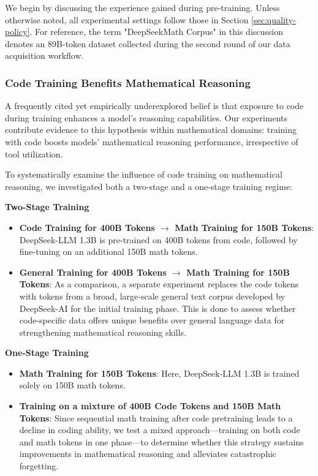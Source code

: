 {We begin by discussing the experience gained during pre-training. Unless otherwise noted, all experimental settings follow those in Section \ref{sec:quality-policy}. For reference, the term "DeepSeekMath Corpus" in this discussion denotes an 89B-token dataset collected during the second round of our data acquisition workflow.

\subsubsection{Code Training Benefits Mathematical Reasoning}

A frequently cited yet empirically underexplored belief is that exposure to code during training enhances a model's reasoning capabilities. Our experiments contribute evidence to this hypothesis within mathematical domains: training with code boosts models’ mathematical reasoning performance, irrespective of tool utilization.

To systematically examine the influence of code training on mathematical reasoning, we investigated both a two-stage and a one-stage training regime:

\textbf{Two-Stage Training}

\begin{itemize}[topsep=0pt]
    \item \textbf{Code Training for 400B Tokens $\rightarrow$ Math Training for 150B Tokens}: DeepSeek-LLM 1.3B is pre-trained on 400B tokens from code, followed by fine-tuning on an additional 150B math tokens.
    \item \textbf{General Training for 400B Tokens $\rightarrow$ Math Training for 150B Tokens}: As a comparison, a separate experiment replaces the code tokens with tokens from a broad, large-scale general text corpus developed by DeepSeek-AI for the initial training phase. This is done to assess whether code-specific data offers unique benefits over general language data for strengthening mathematical reasoning skills.
\end{itemize}

\textbf{One-Stage Training}

\begin{itemize}[topsep=0pt]
    \item \textbf{Math Training for 150B Tokens}: Here, DeepSeek-LLM 1.3B is trained solely on 150B math tokens.
    \item \textbf{Training on a mixture of 400B Code Tokens and 150B Math Tokens}: Since sequential math training after code pretraining leads to a decline in coding ability, we test a mixed approach—training on both code and math tokens in one phase—to determine whether this strategy sustains improvements in mathematical reasoning and alleviates catastrophic forgetting.
\end{itemize}

}

